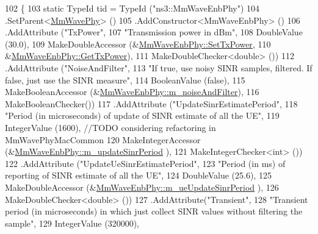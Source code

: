 \begin{DoxyCode}
102 \{
103   \textcolor{keyword}{static} TypeId tid = TypeId (\textcolor{stringliteral}{"ns3::MmWaveEnbPhy"})
104     .SetParent<\hyperlink{classns3_1_1MmWavePhy_a09ab3a0e8114e43dd531977bca8c5f97}{MmWavePhy}> ()
105     .AddConstructor<MmWaveEnbPhy> ()
106         .AddAttribute (\textcolor{stringliteral}{"TxPower"},
107                        \textcolor{stringliteral}{"Transmission power in dBm"},
108                        DoubleValue (30.0),
109                        MakeDoubleAccessor (&\hyperlink{classns3_1_1MmWaveEnbPhy_a6c1dbccbab28c6883bf5a716d6605138}{MmWaveEnbPhy::SetTxPower},
110                                            &\hyperlink{classns3_1_1MmWaveEnbPhy_a83906efb88780c06a13f2f095e25e6a8}{MmWaveEnbPhy::GetTxPower}),
111                        MakeDoubleChecker<double> ())
112         .AddAttribute (\textcolor{stringliteral}{"NoiseAndFilter"},
113                        \textcolor{stringliteral}{"If true, use noisy SINR samples, filtered. If false, just use the SINR measure"},
114                        BooleanValue (\textcolor{keyword}{false}),
115                        MakeBooleanAccessor (&\hyperlink{classns3_1_1MmWaveEnbPhy_adc49fae3719fbc3f8bfed9b49b04a6c6}{MmWaveEnbPhy::m\_noiseAndFilter}),
116                        MakeBooleanChecker())
117         .AddAttribute (\textcolor{stringliteral}{"UpdateSinrEstimatePeriod"},
118                        \textcolor{stringliteral}{"Period (in microseconds) of update of SINR estimate of all the UE"},
119                        IntegerValue (1600), \textcolor{comment}{//TODO considering refactoring in MmWavePhyMacCommon}
120                        MakeIntegerAccessor (&\hyperlink{classns3_1_1MmWaveEnbPhy_af5b7224db4adb4c546e71ec42ce82703}{MmWaveEnbPhy::m\_updateSinrPeriod}
      ),
121                        MakeIntegerChecker<int> ())
122         .AddAttribute (\textcolor{stringliteral}{"UpdateUeSinrEstimatePeriod"},
123                        \textcolor{stringliteral}{"Period (in ms) of reporting of SINR estimate of all the UE"},
124                        DoubleValue (25.6),
125                        MakeDoubleAccessor (&\hyperlink{classns3_1_1MmWaveEnbPhy_aba71f2faaa7e68f79e9156d37c6fed57}{MmWaveEnbPhy::m\_ueUpdateSinrPeriod}
      ),
126                        MakeDoubleChecker<double> ())
127         .AddAttribute(\textcolor{stringliteral}{"Transient"},
128                                   \textcolor{stringliteral}{"Transient period (in microseconds) in which just collect SINR values
       without filtering the sample"},
129                                   IntegerValue (320000),

\end{DoxyCode}
